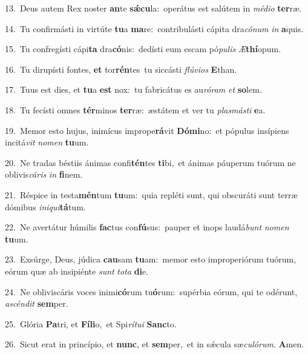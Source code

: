 {\numbfont\textcolor{\numbcolor}{13.}}~Deus autem Rex noster \textbf{an}\-te \textbf{sǽ}\-\textbf{cu}la:~\star operátus est salútem in \textit{mé}\-\textit{di}\textit{o} \textbf{ter}\-ræ.\par
{\numbfont\textcolor{\numbcolor}{14.}}~Tu confirmásti in virtúte \textbf{tu}\-a \textbf{ma}\-re:~\star contribulásti cápita dra\-\textit{có}\-\textit{num} \textit{in} \textbf{a}\-quis.\par
{\numbfont\textcolor{\numbcolor}{15.}}~Tu confregísti cápi\textbf{ta} dra\-\textbf{có}\-nis:~\star dedísti eum escam pó\-\textit{pu}\-\textit{lis} \textit{Æ}\-\textbf{thí}opum.\par
{\numbfont\textcolor{\numbcolor}{16.}}~Tu dirupísti fontes, \textbf{et} tor\-\textbf{rén}\-tes~\star tu siccásti \textit{flú}\-\textit{vi}\textit{os} \textbf{E}\-than.\par
{\numbfont\textcolor{\numbcolor}{17.}}~Tuus est dies, et \textbf{tu}\-a \textbf{est} nox:~\star tu fabricátus es au\-\textit{ró}\-\textit{ram} \textit{et} \textbf{so}\-lem.\par
{\numbfont\textcolor{\numbcolor}{18.}}~Tu fecísti omnes \textbf{tér}\-minos \textbf{ter}\-ræ:~\star æstátem et ver tu \textit{plas}\-\textit{más}\textit{ti} \textbf{e}\-a.\par
{\numbfont\textcolor{\numbcolor}{19.}}~Memor esto hujus, inimícus imprope\-\textbf{rá}\-vit \textbf{Dó}\-\textbf{mi}no:~\star et pópulus insípiens incitá\textit{vit} \textit{no}\-\textit{men} \textbf{tu}\-um.\par
{\numbfont\textcolor{\numbcolor}{20.}}~Ne tradas béstiis ánimas confi\-\textbf{tén}\-tes \textbf{ti}\-bi,~\star et ánimas páuperum tuórum ne oblivis\-\textit{cá}\-\textit{ris} \textit{in} \textbf{fi}\-nem.\par
{\numbfont\textcolor{\numbcolor}{21.}}~Réspice in testa\-\textbf{mén}\-tum \textbf{tu}\-um:~\star quia repléti sunt, qui obscuráti sunt terræ dómibus \textit{in}\-\textit{i}\textit{qui}\textbf{tá}tum.\par
{\numbfont\textcolor{\numbcolor}{22.}}~Ne avertátur húmilis \textbf{fac}\-tus con\-\textbf{fú}\-sus:~\star pauper et inops laudá\textit{bunt} \textit{no}\-\textit{men} \textbf{tu}\-um.\par
{\numbfont\textcolor{\numbcolor}{23.}}~Exsúrge, Deus, júdica \textbf{cau}\-sam \textbf{tu}\-am:~\star memor esto improperiórum tuórum, eórum quæ ab insipiénte \textit{sunt} \textit{to}\-\textit{ta} \textbf{di}\-e.\par
{\numbfont\textcolor{\numbcolor}{24.}}~Ne obliviscáris voces inimi\-\textbf{có}\-rum tu\-\textbf{ó}\-rum:~\star supérbia eórum, qui te odérunt, \textit{a}\-\textit{scén}\textit{dit} \textbf{sem}\-per.\par
{\numbfont\textcolor{\numbcolor}{25.}}~Glória \textbf{Pa}\-tri, et \textbf{Fí}\-\textbf{li}o,~\star et Spi\-\textit{rí}\-\textit{tu}\textit{i} \textbf{Sanc}\-to.\par
{\numbfont\textcolor{\numbcolor}{26.}}~Sicut erat in princípio, et \textbf{nunc}\-, et \textbf{sem}\-per,~\star et in sǽcula sæ\-\textit{cu}\-\textit{ló}\textit{rum}. \textbf{A}\-men.\par
